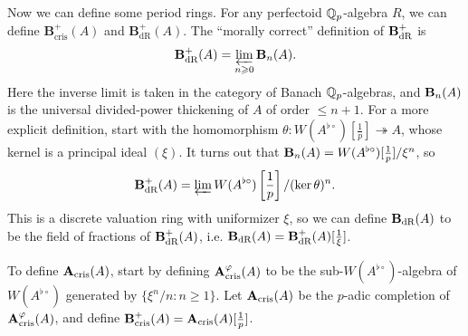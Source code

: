 \documentclass{article}
\begin{document}
Now we can define some period rings. For any perfectoid $\mathbb{Q}_p$-algebra $R$, 
we can define $\mathbf B_\text{cris}^+(A)$ and $\mathbf B_\text{dR}^+(A)$. 
The ``morally correct'' definition of $\mathbf{B}_\textnormal{dR}^+$ is 
\[
  \mathbf{B}_\textnormal{dR}^+(A) = \varprojlim_{n\geqslant 0} \mathbf{B}_n(A).
\]
Here the inverse limit is taken in the category of Banach $\mathbb{Q}_p$-algebras, and 
$\mathbf{B}_n(A)$ is the universal divided-power thickening of $A$ of order 
$\leqslant n+1$. For a more explicit definition, start with the homomorphism 
$\theta:W(A^{\flat\circ})[\frac 1 p] \twoheadrightarrow A$, whose kernel is 
a principal ideal $(\xi)$. It turns out that 
$\mathbf{B}_n(A) = W(A^{\flat\circ})[\frac 1 p]/\xi^n$, so 
\[
  \mathbf{B}_\textnormal{dR}^+(A) = \varprojlim W(A^{\flat\circ})\left[\frac 1 p\right]/(\ker\theta)^n .
\]
This is a discrete valuation ring with uniformizer $\xi$, so we can define 
$\mathbf{B}_\textnormal{dR}(A)$ to be the field of fractions of $\mathbf{B}_\textnormal{dR}^+(A)$, i.e. 
$\mathbf{B}_\textnormal{dR}(A)=\mathbf{B}_\textnormal{dR}^+(A)[\frac 1 \xi]$. 

To define $\mathbf{A}_\textnormal{cris}(A)$, start by defining $\mathbf{A}_\textnormal{cris}^\varphi(A)$ to be the 
sub-$W(A^{\flat\circ})$-algebra of $W(A^{\flat\circ})$ generated by 
$\{\xi^n/n:n\geqslant 1\}$. Let $\mathbf{A}_\textnormal{cris}(A)$ be the $p$-adic completion of 
$\mathbf{A}_\textnormal{cris}^\varphi(A)$, and define $\mathbf{B}_\textnormal{cris}^+(A) = \mathbf{A}_\textnormal{cris}(A)[\frac 1 p]$.







\end{document}

